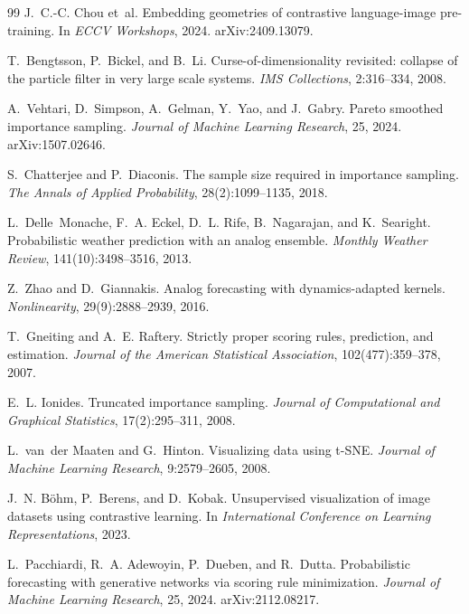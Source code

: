 \documentclass[11pt]{article}
\theoremstyle{plain}
\theoremstyle{definition}
\theoremstyle{remark}
\begin{document}
\begin{thebibliography}{99}
J.~C.-C. Chou et~al.
\newblock Embedding geometries of contrastive language-image pre-training.
\newblock In \emph{ECCV Workshops}, 2024. arXiv:2409.13079.

T.~Bengtsson, P.~Bickel, and B.~Li.
\newblock Curse-of-dimensionality revisited: collapse of the particle filter
 in very large scale systems.
\newblock \emph{IMS Collections}, 2:316--334, 2008.

A.~Vehtari, D.~Simpson, A.~Gelman, Y.~Yao, and J.~Gabry.
\newblock Pareto smoothed importance sampling.
\newblock \emph{Journal of Machine Learning Research}, 25, 2024.
 arXiv:1507.02646.

S.~Chatterjee and P.~Diaconis.
\newblock The sample size required in importance sampling.
\newblock \emph{The Annals of Applied Probability}, 28(2):1099--1135, 2018.

L.~Delle~Monache, F.~A. Eckel, D.~L. Rife, B.~Nagarajan, and K.~Searight.
\newblock Probabilistic weather prediction with an analog ensemble.
\newblock \emph{Monthly Weather Review}, 141(10):3498--3516, 2013.

Z.~Zhao and D.~Giannakis.
\newblock Analog forecasting with dynamics-adapted kernels.
\newblock \emph{Nonlinearity}, 29(9):2888--2939, 2016.

T.~Gneiting and A.~E. Raftery.
\newblock Strictly proper scoring rules, prediction, and estimation.
\newblock \emph{Journal of the American Statistical Association},
 102(477):359--378, 2007.

E.~L. Ionides.
\newblock Truncated importance sampling.
\newblock \emph{Journal of Computational and Graphical Statistics},
 17(2):295--311, 2008.

L.~van~der Maaten and G.~Hinton.
\newblock Visualizing data using t-SNE.
\newblock \emph{Journal of Machine Learning Research}, 9:2579--2605, 2008.

J.~N. B\"ohm, P.~Berens, and D.~Kobak.
\newblock Unsupervised visualization of image datasets using contrastive
 learning.
\newblock In \emph{International Conference on Learning Representations},
 2023.

L.~Pacchiardi, R.~A. Adewoyin, P.~Dueben, and R.~Dutta.
\newblock Probabilistic forecasting with generative networks via scoring rule
 minimization.
\newblock \emph{Journal of Machine Learning Research}, 25, 2024.
 arXiv:2112.08217.


\end{thebibliography}
\end{document}
